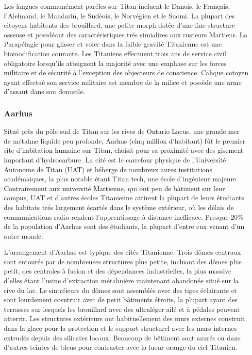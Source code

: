 Les langues communément paréles sur Titan incluent le Danois, le Français, l'Alelmand, le Mandarin, le Sudéois, le Norvégien et le Suomi. La plupart des citoyens habitents des brouillard, une petite morph dotée d'une fine structure osseuse et possdéant des caractéristiques trés simialires aux rusteurs Martiens. La Parapélagie pour glisser et voler dans la faible gravité Titanienne est une biomodification courante. Les Titaniens effectuent trois ans de service civil obligatoire lorsqu'ils atteignent la majorité avec une emphase sur les forces militaire et de sécurité à l'exception des objecteurs de conscience. Cahque cotoyen ayant effectué son service militaire est membre de la milice et possède une arme d'assaut dans son domicile. 

\subsubsection{Aarhus} \label{sec:aarhus} 

Situé près du pôle sud de Titan sur les rives de Ontario Lacus, une grande mer de métahne liquide peu profonde, Aarhus (cinq million d'habitant) fût le premier site d'habitation humaine sur Titan, choisit pour sa proximité avec des gisement important d'hydrocarbure. La cité est le carrefour physique de l'Université Autonome de Titan (UAT) et héberge de nombreux aures institutions académaiques, la plus notable étant Titan tech, une école d'ingénieur majeure. Contrairement aux université Martienne, qui ont peu de bâtiment sur leur campus, UAT et d'autres écoles Titanienne attirent la plupart de leurs étudiants des habitats trés largement écartés dans le système extérieur, où les délais de communications radio rendent l'apprentissage à distance inefficace. Presque 20\% de la population d'Aarhus sont des étudiants, la plupart d'entre eux venant d'un autre monde. 

L'arrangement d'Aarhus est typique des cités Titanienne. Trois dômes centraux sont entourés par de nombreuses structures plus petite, incluant des dômes plus petit, des centrales à fusion et des dépendances industrielles, la plus massive d'elles étant l'usine d'extraction métahnière maintenant abandonée situé sur la rive du lac. Le sintréieurs du dômes sont assemblés avec des tiges éclairante et sont lourdement cosntruit avec de petit bâtiments étroits, la plupart ayant des terrasses sur lesquels les brouillard avec des ultraléger ailé et à pédales peuvent atterrir. Les structures extérieurs ont habituellement des murs externes construit dans la glace pour la protection et le support structurel avec les murs internes extrudés depuis des silicates locaux. Beaucoup de bêtiment sont azurés ou dans d'autres teintes de bleus pour contraster avec la lueur orange du ciel Titanien. 


